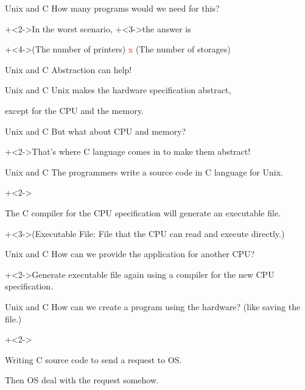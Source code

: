 \begin{frame}{Unix and C}{}
    How many programs would we need for this?
    \vspace{4ex}

    \onslide+<2->{In the worst scenario,}
    \onslide+<3->{the answer is}
    \vspace{4ex}

    \onslide+<4->{{\small(The number of printers) \textcolor{red}{x} (The number of storages)}}
\end{frame}


\begin{frame}{Unix and C}{}
    Abstraction can help!
\end{frame}


\begin{frame}{Unix and C}{}
    Unix makes the hardware specification abstract,

    except for the CPU and the memory.
\end{frame}


\begin{frame}{Unix and C}{}
    But what about CPU and memory?
    \vspace{4ex}

    \onslide+<2->{That's where C language comes in to make them abstract!}
\end{frame}


\begin{frame}{Unix and C}{}
    The programmers write a source code in C language for Unix.
    \vspace{4ex}

    \onslide+<2->{The C compiler for the CPU specification will generate an executable file.
    \vspace{2ex}

    \onslide+<3->{(Executable File: File that the CPU can read and execute directly.)}}
\end{frame}


\begin{frame}{Unix and C}{}
    How can we provide the application for another CPU?
    \vspace{4ex}

    \onslide+<2->{Generate executable file again using a compiler for the new CPU specification.}
\end{frame}


\begin{frame}{Unix and C}{}
    How can we create a program using the hardware? (like saving the file.)
    \vspace{4ex}

    \onslide+<2->{Writing C source code to send a request to OS.

    Then OS deal with the request somehow.}
\end{frame}


